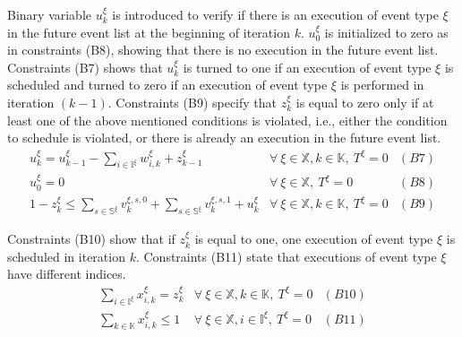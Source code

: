 \documentclass[suppldata]{interact}
\theoremstyle{plain}
\theoremstyle{definition}
\theoremstyle{remark}
\begin{document}
Binary variable $u^{\xi}_k$ is introduced to verify if there is an execution of event type $\xi$ in the future event list at the beginning of iteration $k$. $u^{\xi}_{0}$ is initialized to zero as in constraints (B8), showing that there is no execution in the future event list. Constraints (B7) shows that $u^{\xi}_k$ is turned to one if an execution of event type ${\xi}$ is scheduled and turned to zero if an execution of event type ${\xi}$ is performed in iteration $(k-1)$.
Constraints (B9) specify that $z^{\xi}_k$ is equal to zero only if at least one of the above mentioned conditions is violated, i.e., either the condition to schedule is violated, or there is already an execution in the future event list. 
\begin{eqnarray}
	u^{\xi}_k = u^{\xi}_{k-1} - \sum_{i\in \mathbb{I}^{\xi}}w^{\xi}_{i,k} + z^{\xi}_{k-1} & \forall\ \xi\in \mathbb{X},k\in \mathbb{K},\ T^{\xi} = 0 &(B7)\nonumber\\
	u^{\xi}_{0} = 0&  \forall\ \xi\in \mathbb{X},\ T^{\xi} = 0 &(B8)\nonumber\\
	1 - z^{\xi}_{k} \le \sum_{s\in \mathbb{S}^{\xi}} v^{\xi,s,0}_k + \sum_{s\in \mathbb{S}^{\xi}} v^{\xi,s,1}_k+u^{\xi}_k&\forall\ \xi\in \mathbb{X},k\in \mathbb{K},\ T^{\xi} = 0&(B9)\nonumber
\end{eqnarray}

Constraints (B10) show that if $z^{\xi}_k$ is equal to one, one execution of event type ${\xi}$ is scheduled in iteration $k$. Constraints (B11) state that executions of event type ${\xi}$ have different indices.
\begin{eqnarray}
	\sum_{i\in \mathbb{I}^{\xi}} x^{\xi}_{i,k} = z^{\xi}_k&\forall\ \xi\in \mathbb{X},k\in \mathbb{K},\ T^{\xi} = 0&(B10)\nonumber\\
	\sum_{k\in \mathbb{K}} x^{\xi}_{i,k} \le 1& \forall\ \xi\in \mathbb{X},i\in \mathbb{I}^{\xi},\ T^{\xi} = 0&(B11)\nonumber
\end{eqnarray}
\end{document}
